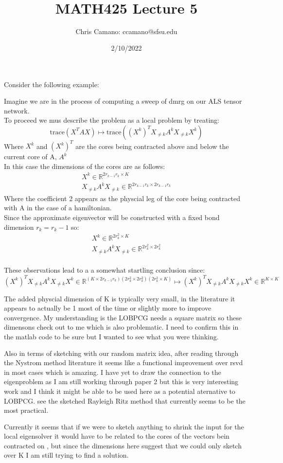 \documentclass[12pt,a4paper]{article}
\author{Chris Camano: ccamano@sfsu.edu}
\title{MATH425 Lecture 5 }
\date{2/10/2022}
\begin{document}
Consider the following example:

Imagine we are in the process of computing a sweep of dmrg on our ALS tensor network. \\
To proceed we mus describe the problem as a local problem by treating:
\newcommand{\Tr}{\text{trace}}
\[
   \Tr(X^TAX)\mapsto \Tr\left((X^k)^TX_{\neq k} A^k X_{\neq k}X^k \right)
\]
Where $X^k$ and $(X^k)^T$ are the cores being contracted above and below the current core of A, $A^k$\\

In this case the dimensions of the cores are as follows:
\begin{align*}
  X^k \in \mathbb{R}^{2r_{k-1}r_{k}\times K}\\
  X_{\neq k} A^k X_{\neq k} \in \mathbb{R}^{2r_{k-1}r_{k}\times 2r_{k-1}r_{k}}
\end{align*}
Where the coefficient 2 appears as the physcial leg of the core being contracted with A in the case of a hamiltonian. \\

Since the approximate eigenvector will be constructed with a fixed bond dimension $r_k=r_k-1$ so: \\
\begin{align*}
  X^k \in \mathbb{R}^{2r_{k}^2\times K}\\
  X_{\neq k} A^k X_{\neq k} \in \mathbb{R}^{2r_{k}^2\times 2r_{k}^2}
\end{align*}
\\
These observations lead to a a somewhat startling conclusion since:
\[

  (X^k)^TX_{\neq k} A^k X_{\neq k}X^k \in \mathbb{R}^{(K \times 2r_{k-1}r_{k})(2r_{k}^2\times 2r_{k}^2)(2r_{k}^2\times K)} \mapsto (X^k)^TX_{\neq k} A^k X_{\neq k}X^k \in \mathbb{R}^{K\times K}
\]

The added physcial dimension of K is typically very small, in the literature it appears to actually be 1 most of the time or slightly more to improve convergence. My understanding is the LOBPCG needs a square matrix so these dimensons check out to me which is also problematic. I need to confirm this in the matlab code to be sure but I wanted to see what you were thinking.

Also in terms of sketching with our random matrix idea, after reading through the Nystrom method literature it seems like a functional improvement over rsvd in most cases which is amazing. I have yet to draw the connection to the eigenproblem as I am still working through paper 2 but this is very interesting work and I think it might be able to be used here as a potential aternative to LOBPCG. see the sketched Rayleigh Ritz method that currently seems to be the most practical.

 Currently it seems that if we were to sketch anything to shrink the input for the local eigensolver it would have to be related to the cores of the vectors bein contracted on , but since the dimensions here suggest that we could only sketch over K I am still trying to find a solution. 
\end{document}
